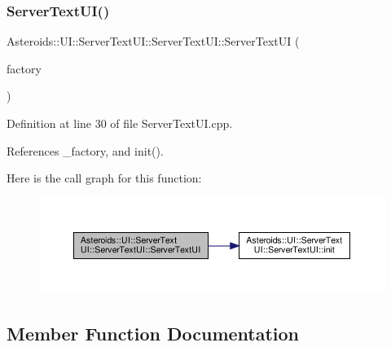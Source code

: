 \subsubsection{\texorpdfstring{Server\+Text\+U\+I()}{ServerTextUI()}}
{\footnotesize\ttfamily Asteroids\+::\+U\+I\+::\+Server\+Text\+U\+I\+::\+Server\+Text\+U\+I\+::\+Server\+Text\+UI (\begin{DoxyParamCaption}\item[{std\+::shared\+\_\+ptr$<$ \hyperlink{classAsteroids_1_1Domain_1_1Factory_1_1FactoryInterface}{Asteroids\+::\+Domain\+::\+Factory\+::\+Factory\+Interface} $>$}]{factory }\end{DoxyParamCaption})}



Definition at line 30 of file Server\+Text\+U\+I.\+cpp.



References \+\_\+factory, and init().

Here is the call graph for this function\+:\nopagebreak
\begin{figure}[H]
\begin{center}
\leavevmode
\includegraphics[width=350pt]{classAsteroids_1_1UI_1_1ServerTextUI_1_1ServerTextUI_aa66ce6a8f5a8293e564ba7fe5848eee6_cgraph}
\end{center}
\end{figure}


\subsection{Member Function Documentation}
\mbox{\label{classAsteroids_1_1UI_1_1ServerTextUI_1_1ServerTextUI_a35d6eb54e2eabfff2cc1ee47a6c228c6}} 
